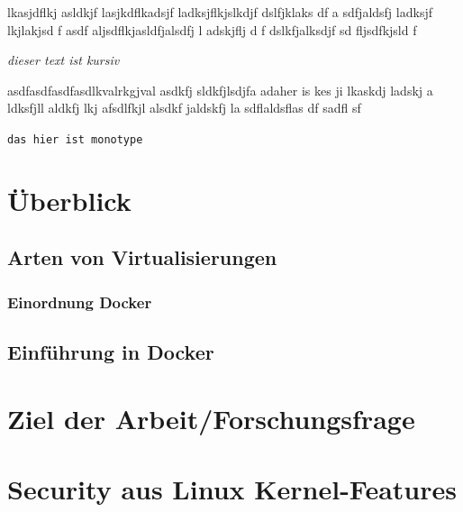 \documentclass[11pt,a4paper,oneside]{report}
\begin{document}
lkasjdflkj asldkjf lasjkdflkadsjf ladksjflkjslkdjf    dslfjklaks df a sdfjaldsfj  ladksjf lkjlakjsd f asdf aljsdflkjasldfjalsdfj l adskjflj d f dslkfjalksdjf sd fljsdfkjsld f

\emph{dieser text ist kursiv}

asdfasdfasdfasdlkvalrkgjval  asdkfj  sldkfjlsdjfa adaher is kes ji lkaskdj ladskj a ldksfjll aldkfj lkj afsdlfkjl alsdkf jaldskfj la sdflaldsflas df sadfl sf

\texttt{das hier ist monotype}



\chapter{Überblick}
	\section{Arten von Virtualisierungen}
	  \subsection{Einordnung Docker}
  \section{Einführung in Docker}
\chapter{Ziel der Arbeit/Forschungsfrage}
\chapter{Security aus Linux Kernel-Features}
\end{document}
